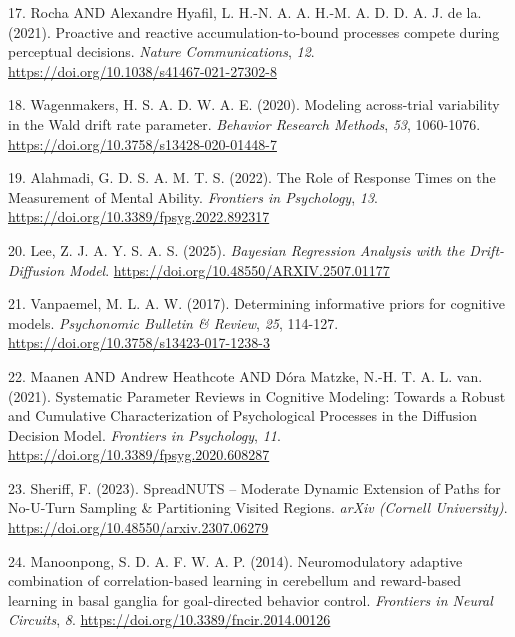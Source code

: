 \documentclass[
  spanish,
  10pt,
]{article}
\newlength{\cslhangindent}
\newenvironment{CSLReferences}[2] %
 {\begin{list}{}{%
  \setlength{\itemindent}{0pt}
  \setlength{\leftmargin}{0pt}
  \setlength{\parsep}{0pt}
  \ifodd #1
   \setlength{\leftmargin}{\cslhangindent}
   \setlength{\itemindent}{-1\cslhangindent}
  \fi
  \setlength{\itemsep}{#2\baselineskip}}}
 {\end{list}}
\begin{document}
\begin{CSLReferences}{1}{0}
17. Rocha AND Alexandre Hyafil, L. H.-N. A. A. H.-M. A. D. D. A. J. de
la. (2021). Proactive and reactive accumulation-to-bound processes
compete during perceptual decisions. \emph{Nature Communications},
\emph{12}. \url{https://doi.org/10.1038/s41467-021-27302-8}

18. Wagenmakers, H. S. A. D. W. A. E. (2020). Modeling across-trial
variability in the Wald drift rate parameter. \emph{Behavior Research
Methods}, \emph{53}, 1060-1076.
\url{https://doi.org/10.3758/s13428-020-01448-7}

19. Alahmadi, G. D. S. A. M. T. S. (2022). The Role of Response Times on
the Measurement of Mental Ability. \emph{Frontiers in Psychology},
\emph{13}. \url{https://doi.org/10.3389/fpsyg.2022.892317}

20. Lee, Z. J. A. Y. S. A. S. (2025). \emph{Bayesian Regression Analysis
with the Drift-Diffusion Model}.
\url{https://doi.org/10.48550/ARXIV.2507.01177}

21. Vanpaemel, M. L. A. W. (2017). Determining informative priors for
cognitive models. \emph{Psychonomic Bulletin \& Review}, \emph{25},
114-127. \url{https://doi.org/10.3758/s13423-017-1238-3}

22. Maanen AND Andrew Heathcote AND Dóra Matzke, N.-H. T. A. L. van.
(2021). Systematic Parameter Reviews in Cognitive Modeling: Towards a
Robust and Cumulative Characterization of Psychological Processes in the
Diffusion Decision Model. \emph{Frontiers in Psychology}, \emph{11}.
\url{https://doi.org/10.3389/fpsyg.2020.608287}

23. Sheriff, F. (2023). SpreadNUTS -- Moderate Dynamic Extension of
Paths for No-U-Turn Sampling \& Partitioning Visited Regions.
\emph{arXiv (Cornell University)}.
\url{https://doi.org/10.48550/arxiv.2307.06279}

24. Manoonpong, S. D. A. F. W. A. P. (2014). Neuromodulatory adaptive
combination of correlation-based learning in cerebellum and reward-based
learning in basal ganglia for goal-directed behavior control.
\emph{Frontiers in Neural Circuits}, \emph{8}.
\url{https://doi.org/10.3389/fncir.2014.00126}


\end{CSLReferences}
\end{document}
